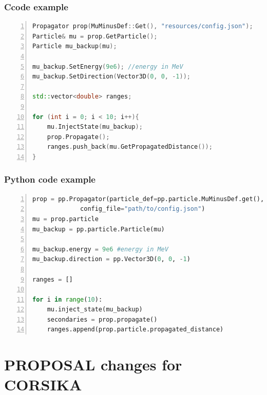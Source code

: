 \documentclass[aspectratio=1610, captions=tableheading, 11pt]{beamer}
\newcommand\CC{C\nolinebreak[4]\hspace{-.05em}\raisebox{.4ex}{\relsize{-3}{\textbf{++}}}\:}
\begin{document}
\begin{frame}[fragile]
  \vspace{-10mm}
\frametitle{\CC code example}
\begin{lstlisting}[language=C++,basicstyle=\small\ttfamily,keywordstyle=\color{red}, escapechar=\!, numbers=left, numberstyle=\tiny\ttfamily, numbersep=5pt]
Propagator prop(MuMinusDef::Get(), "resources/config.json");
Particle& mu = prop.GetParticle();
Particle mu_backup(mu);

mu_backup.SetEnergy(9e6); //energy in MeV
mu_backup.SetDirection(Vector3D(0, 0, -1));

std::vector<double> ranges;

for (int i = 0; i < 10; i++){
    mu.InjectState(mu_backup);
    prop.Propagate();  
    ranges.push_back(mu.GetPropagatedDistance());
}
\end{lstlisting}
\end{frame}

\begin{frame}[fragile]
  \vspace{-10mm}
\frametitle{Python code example}
\begin{lstlisting}[language=python,basicstyle=\small\ttfamily,keywordstyle=\color{red}, escapechar=\!, numbers=left, numberstyle=\tiny\ttfamily, numbersep=5pt]
prop = pp.Propagator(particle_def=pp.particle.MuMinusDef.get(), 
		     config_file="path/to/config.json")
mu = prop.particle
mu_backup = pp.particle.Particle(mu)

mu_backup.energy = 9e6 #energy in MeV
mu_backup.direction = pp.Vector3D(0, 0, -1)

ranges = []

for i in range(10):
    mu.inject_state(mu_backup)
    secondaries = prop.propagate()
    ranges.append(prop.particle.propagated_distance)
\end{lstlisting}

\end{frame}


\section{PROPOSAL changes for CORSIKA}
\end{document}
